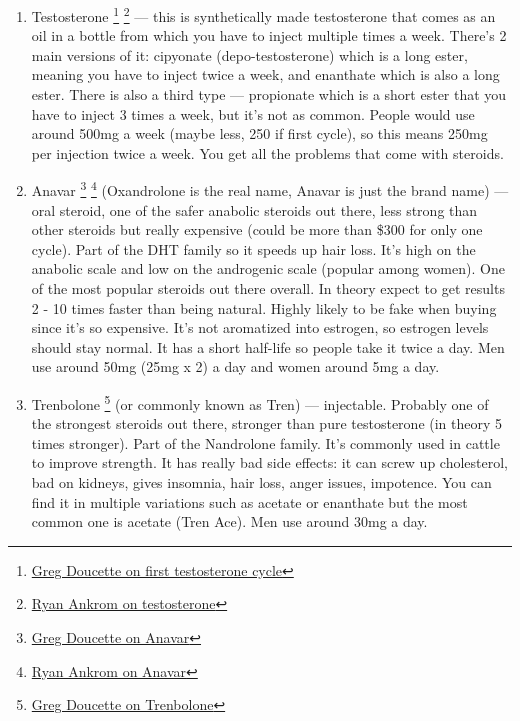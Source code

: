 \documentclass[openany, 12pt]{book}
\begin{document}
	\begin{enumerate}

		\item Testosterone
                  \footnote{\href{https://www.youtube.com/watch?v=SMaLWzRCmSA/}{Greg Doucette on first testosterone cycle}}
                  \footnote{\href{https://www.youtube.com/watch?v=kIkSrgsIDcY/}{Ryan Ankrom on testosterone}}
                  --- this is synthetically made testosterone that comes as an oil in a bottle from which you have to inject multiple times a week. There's 2 main versions of it:
                  cipyonate (depo-testosterone) which is a long ester, meaning you have to inject twice a week, and enanthate which is also a long ester. There is also a third type --- propionate
                  which is a short ester that you have to inject 3 times a week, but it's not as common. People would use around 500mg a week (maybe less, 250 if first cycle), so this means 250mg per
                  injection twice a week. You get all the problems that come with steroids.
                    
		\item Anavar
                  \footnote{\href{https://www.youtube.com/watch?v=J4t4BeQaL8g}{Greg Doucette on Anavar}}
                  \footnote{\href{https://www.youtube.com/watch?v=9A2z7i9yP_4}{Ryan Ankrom on Anavar}}
                  (Oxandrolone is the real name, Anavar is just the brand name) --- oral steroid, one of the safer anabolic steroids out there, less strong than other steroids but really expensive
                  (could be more than \$300 for only one cycle). Part of the DHT family so it speeds up hair loss.
                  It's high on the anabolic scale and low on the androgenic scale (popular among women). One of the most popular steroids out there overall.
                  In theory expect to get results 2 - 10 times faster than being natural. Highly likely to be fake when buying since it's so expensive.
                  It's not aromatized into estrogen, so estrogen levels should stay normal.
                  It has a short half-life so people take it twice a day. Men use around 50mg (25mg x 2) a day and women around 5mg a day.

		\item Trenbolone
                  \footnote{\href{https://www.youtube.com/watch?v=tIvJh53jVfY/}{Greg Doucette on Trenbolone}}
                  (or commonly known as Tren) --- injectable. Probably one of the strongest steroids out there, stronger than pure testosterone (in theory 5 times stronger).
                  Part of the Nandrolone family. It's commonly used in cattle to improve strength.
                  It has really bad side effects: it can screw up cholesterol, bad on kidneys, gives insomnia, hair loss, anger issues, impotence. You can find it in multiple
                  variations such as acetate or enanthate but the most common one is acetate (Tren Ace). Men use around 30mg a day.


\end{enumerate}
\end{document}
